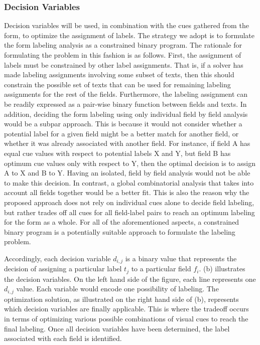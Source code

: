 \subsubsection{Decision Variables}
\label{subsec:opt}
Decision variables will be used, in combination with the cues 
gathered from the form, to optimize the assignment of labels. 
The strategy we adopt is to formulate the form labeling analysis 
as a constrained binary program. The rationale for formulating the 
problem in this fashion is as follows. First, the assignment of 
labels must be constrained by other label assignments. That is, 
if a solver has made labeling assignments involving some subset 
of texts, then this should constrain the possible set of texts 
that can be used for remaining labeling assignments for the rest 
of the fields. Furthermore, the labeling assignment can be readily 
expressed as a pair-wise binary function between fields and texts. 
In addition, deciding the form labeling using only individual  
field by field analysis would be a subpar approach. This is because it  
would not consider whether a potential label for a given field might be 
a better match for another field, or whether it was already associated 
with another field. For instance, if field A has equal cue values 
with respect to potential labels X and Y, but field B has optimum 
cue values only with respect to Y, then the optimal decision is to 
assign A to X and B to Y. Having an isolated, field by field analysis 
would not be able to make this decision. In contrast, a global 
combinatorial analysis that takes into account all fields together 
would be a better fit. This is also the reason why the proposed approach 
does not rely on individual cues alone to decide field labeling, but rather 
trades off all cues for all field-label pairs to reach an optimum labeling 
for the form as a whole. For all of the aforementioned aspects, 
a constrained binary program is a potentially suitable approach 
to formulate the labeling problem. 

Accordingly, each decision variable $d_{i,j}$ is a binary value that 
represents the decision of assigning a particular label $t_j$ to a 
particular field $f_i$. (b) illustrates the decision variables. 
On the left hand side of the figure, each line represents one $d_{i,j}$ value. 
Each variable would encode one possibility of labeling. The optimization 
solution, as illustrated on the right hand side of (b), 
represents which decision variables are finally applicable. This is where the 
tradeoff occurs in terms of optimizing various possible combinations of 
visual cues to reach the final labeling. Once all decision 
variables have been determined, the label associated with each field 
is identified. 

